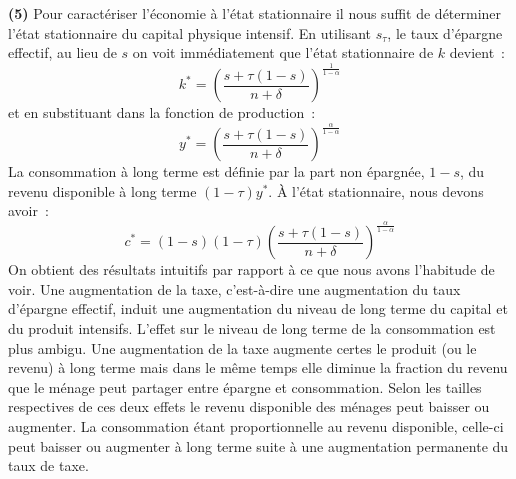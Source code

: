 \documentclass[10pt,a4paper,notitlepage,onecolumn]{article}
\newcommand{\question}[1]{\textbf{(#1)}}
\begin{document}
\question{5} Pour caractériser l'économie à l'état
stationnaire il nous suffit de déterminer  l'état stationnaire du
capital physique intensif. En utilisant $s_{\tau}$, le taux
d'épargne effectif, au lieu de $s$ on voit immédiatement que l'état
stationnaire de $k$ devient~:
\[
k^{\ast} = \left(\frac{s +
\tau(1-s)}{n+\delta}\right)^{\frac{1}{1-\alpha}}
\]
et en substituant dans la fonction de production~:
\[
y^{\ast} = \left(\frac{s +
\tau(1-s)}{n+\delta}\right)^{\frac{\alpha}{1-\alpha}}
\]
La consommation à long terme est définie par la part non épargnée,
$1-s$, du revenu disponible à long terme $(1-\tau)y^{\ast}$. \`A
l'état stationnaire, nous devons avoir~:
\[
c^{\ast} = (1-s)(1-\tau)\left(\frac{s +
\tau(1-s)}{n+\delta}\right)^{\frac{\alpha}{1-\alpha}}
\]
On obtient des résultats intuitifs par rapport à ce que nous avons
l'habitude de voir. Une augmentation de la taxe, c'est-à-dire une
augmentation du taux d'épargne effectif, induit une augmentation du
niveau de long terme du capital et du produit intensifs. L'effet sur
le niveau de long terme de la consommation est plus ambigu. Une
augmentation de la taxe augmente certes le produit (ou le revenu) à
long terme mais dans le même temps elle diminue la fraction du
revenu que le ménage peut partager entre épargne et consommation.
Selon les tailles respectives de ces deux effets le revenu
disponible des ménages peut baisser ou augmenter. La consommation
étant proportionnelle au revenu disponible, celle-ci peut baisser ou
augmenter à long terme suite à une augmentation permanente du taux
de taxe.\newline
\end{document}
